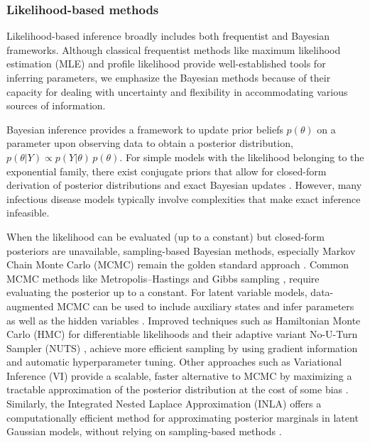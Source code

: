 \documentclass{article}
\begin{document}
\subsubsection{Likelihood-based methods}
Likelihood-based inference broadly includes both frequentist and Bayesian frameworks. Although classical frequentist methods like maximum likelihood estimation (MLE)\citep{myung2003tutorial, baltazar2024maximum} and profile likelihood \citep{tonsing2018profile, plank2024structured} provide well-established tools for inferring parameters, we emphasize the Bayesian methods because of their capacity for dealing with uncertainty and flexibility in accommodating various sources of information.

Bayesian inference provides a framework to update prior beliefs $ p(\theta)$ on a parameter upon observing data to obtain a posterior distribution, $p(\theta | Y) \propto p(Y|\theta) \,p(\theta)$. For simple models with the likelihood belonging to the exponential family, there exist conjugate priors that allow for closed-form derivation of posterior distributions and exact Bayesian updates \citep{gelman1995bayesian,  cori2013new}. However, many infectious disease models typically involve complexities that make exact inference infeasible.

When the likelihood can be evaluated (up to a constant) but closed-form posteriors are unavailable, sampling-based Bayesian methods, especially Markov Chain Monte Carlo (MCMC) remain the golden standard approach \citep{gilks1995markov, lekone2006statistical}. Common MCMC methods like Metropolis–Hastings \citep{hastings1970monte} and Gibbs sampling \citep{geman1984stochastic}, require evaluating the posterior up to a constant. For latent variable models, data-augmented MCMC can be used to include auxiliary states and infer parameters as well as the hidden variables \citep{o1999bayesian}. Improved techniques such as Hamiltonian Monte Carlo (HMC) for differentiable likelihoods \citep{duane1987hybrid} and their adaptive variant No-U-Turn Sampler (NUTS) \citep{hoffman2014no, andrade2020evaluation}, achieve more efficient sampling by using gradient information and automatic hyperparameter tuning. Other approaches such as Variational Inference (VI) provide a scalable, faster alternative to MCMC by maximizing a tractable approximation of the posterior distribution at the cost of some bias \citep{blei2017variational, chatzilena2019contemporary}. Similarly, the Integrated Nested Laplace Approximation (INLA) offers a computationally efficient method for approximating posterior marginals in latent Gaussian models, without relying on sampling-based methods \citep{rue2017bayesian}.
\end{document}
